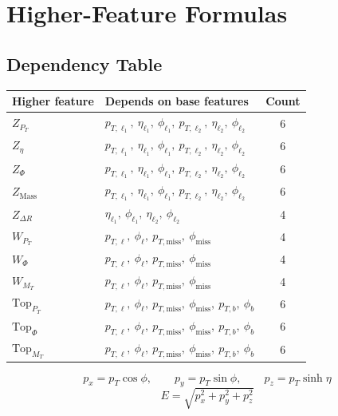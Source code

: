 \documentclass{article}
\begin{document}
\section*{Higher-Feature Formulas}

\subsection*{Dependency Table}
\begin{center}
\begin{tabular}{|l|p{9.2cm}|c|}
\hline
Higher feature & Depends on base features & Count \\
\hline
$Z_{P_T}$ & $p_{T,\ell_1},\ \eta_{\ell_1},\ \phi_{\ell_1},\ p_{T,\ell_2},\ \eta_{\ell_2},\ \phi_{\ell_2}$ & 6 \\
\hline
$Z_{\eta}$ & $p_{T,\ell_1},\ \eta_{\ell_1},\ \phi_{\ell_1},\ p_{T,\ell_2},\ \eta_{\ell_2},\ \phi_{\ell_2}$ & 6 \\
\hline
$Z_{\Phi}$ & $p_{T,\ell_1},\ \eta_{\ell_1},\ \phi_{\ell_1},\ p_{T,\ell_2},\ \eta_{\ell_2},\ \phi_{\ell_2}$ & 6 \\
\hline
$Z_{\mathrm{Mass}}$ & $p_{T,\ell_1},\ \eta_{\ell_1},\ \phi_{\ell_1},\ p_{T,\ell_2},\ \eta_{\ell_2},\ \phi_{\ell_2}$ & 6 \\
\hline
$Z_{\Delta R}$ & $\eta_{\ell_1},\ \phi_{\ell_1},\ \eta_{\ell_2},\ \phi_{\ell_2}$ & 4 \\
\hline
$W_{P_T}$ & $p_{T,\ell},\ \phi_{\ell},\ p_{T,\mathrm{miss}},\ \phi_{\mathrm{miss}}$ & 4 \\
\hline
$W_{\Phi}$ & $p_{T,\ell},\ \phi_{\ell},\ p_{T,\mathrm{miss}},\ \phi_{\mathrm{miss}}$ & 4 \\
\hline
$W_{M_T}$ & $p_{T,\ell},\ \phi_{\ell},\ p_{T,\mathrm{miss}},\ \phi_{\mathrm{miss}}$ & 4 \\
\hline
$\mathrm{Top}_{P_T}$ & $p_{T,\ell},\ \phi_{\ell},\ p_{T,\mathrm{miss}},\ \phi_{\mathrm{miss}},\ p_{T,b},\ \phi_b$ & 6 \\
\hline
$\mathrm{Top}_{\Phi}$ & $p_{T,\ell},\ \phi_{\ell},\ p_{T,\mathrm{miss}},\ \phi_{\mathrm{miss}},\ p_{T,b},\ \phi_b$ & 6 \\
\hline
$\mathrm{Top}_{M_T}$ & $p_{T,\ell},\ \phi_{\ell},\ p_{T,\mathrm{miss}},\ \phi_{\mathrm{miss}},\ p_{T,b},\ \phi_b$ & 6 \\
\hline
\end{tabular}
\end{center}

\[
p_x = p_T\cos\phi, \qquad p_y = p_T\sin\phi, \qquad p_z = p_T\sinh\eta
\]
\[
E = \sqrt{p_x^2 + p_y^2 + p_z^2}
\]
\end{document}
